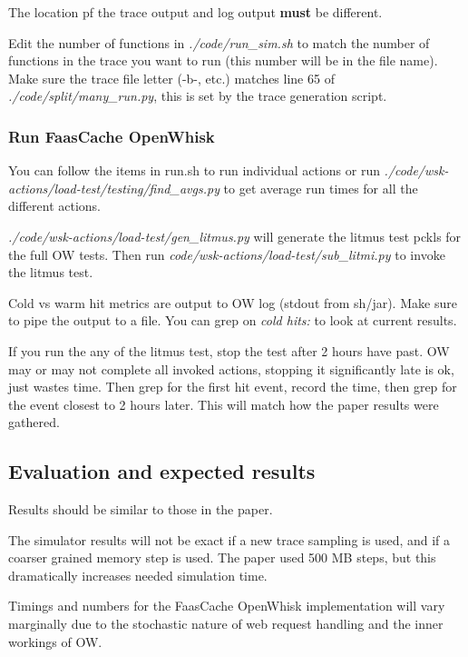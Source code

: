 {The location pf the trace output and log output {\bf must} be different.

Edit the number of functions in {\em ./code/run\_sim.sh} to match the number of functions in the trace you want to run (this number will be in the file name).
Make sure the trace file letter (-b-, etc.) matches line 65 of {\em ./code/split/many\_run.py}, this is set by the trace generation script.

\subsubsection{Run FaasCache OpenWhisk}

You can follow the items in run.sh to run individual actions or run {\em ./code/wsk-actions/load-test/testing/find\_avgs.py} to get average run times for all the different actions.

{\em ./code/wsk-actions/load-test/gen\_litmus.py} will generate the litmus test pckls for the full OW tests.
Then run {\em code/wsk-actions/load-test/sub\_litmi.py} to invoke the litmus test.

Cold vs warm hit metrics are output to OW log (stdout from sh/jar). 
Make sure to pipe the output to a file.
You can grep on {\em cold hits:} to look at current results.

If you run the any of the litmus test, stop the test after 2 hours have past.
OW may or may not complete all invoked actions, stopping it significantly late is ok, just wastes time.
Then grep for the first hit event, record the time, then grep for the event closest to 2 hours later.
This will match how the paper results were gathered.

\subsection{Evaluation and expected results}

Results should be similar to those in the paper. 

The simulator results will not be exact if a new trace sampling is used, and if a coarser grained memory step is used.
The paper used 500 MB steps, but this dramatically increases needed simulation time.

Timings and numbers for the FaasCache OpenWhisk implementation will vary marginally due to the stochastic nature of web request handling and the inner workings of OW.


}
